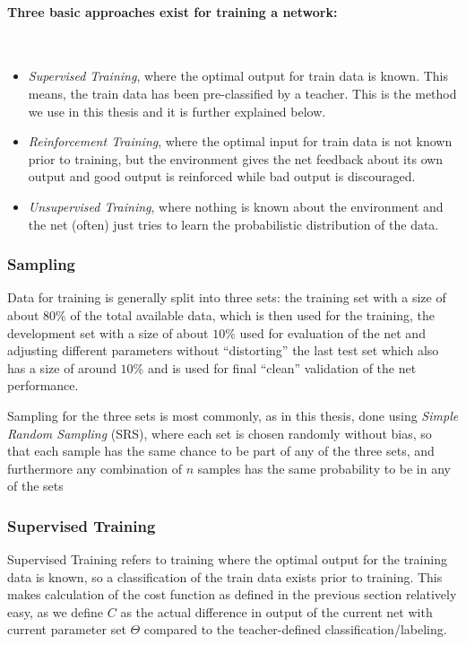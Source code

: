 \paragraph{Three basic approaches exist for training a network:} \hspace{0pt} \\
\begin{itemize}
\item \textit{Supervised Training}, where the optimal output for train data is known. This means, the train data has been pre-classified by a teacher. This is the method we use in this thesis and it is further explained below.
\item \textit{Reinforcement Training}, where the optimal input for train data is not known prior to training, but the environment gives the net feedback about its own output and good output is reinforced while bad output is discouraged.
\item \textit{Unsupervised Training}, where nothing is known about the environment and the net (often) just tries to learn the probabilistic distribution of the data.
\end{itemize}

\subsubsection{Sampling}
\label{sec:fund:Sampling}

Data for training is generally split into three sets: the training set with a size of about \(80\%\) of the total available data, which is then used for the training, the development set with a size of about \(10\%\) used for evaluation of the net and adjusting different parameters without ``distorting'' the last test set which also has a size of around \(10\%\) and is used for final ``clean'' validation of the net performance.


Sampling for the three sets is most commonly, as in this thesis, done using \textit{Simple Random Sampling} (SRS), where each set is chosen randomly without bias, so that each sample has the same chance to be part of any of the three sets, and furthermore any combination of \(n\) samples has the same probability to be in any of the sets~\cite{meng2013scalable}

\subsubsection{Supervised Training}
\label{sec:fund:ST}
Supervised Training refers to training where the optimal output for the training data is known, so a classification of the train data exists prior to training. This makes calculation of the cost function as defined in the previous section relatively easy, as we define \(C\) as the actual difference in output of the current net with current parameter set \(\Theta\) compared to the teacher-defined classification/labeling. 

